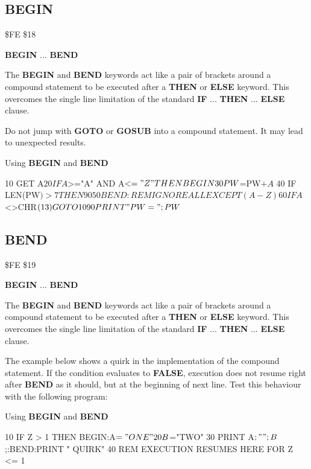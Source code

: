 
\newpage
\subsection{BEGIN}
\begin{description}[leftmargin=3cm,style=nextline]
\item [Token:] \$FE \$18
\item [Format:] {\bf BEGIN} ... {\bf BEND}
\item [Usage:] The {\bf BEGIN} and {\bf BEND} keywords act like
               a pair of brackets around a compound statement
               to be executed after a {\bf THEN} or {\bf ELSE} keyword.
               This overcomes the single line limitation of the
               standard {\bf IF} ... {\bf THEN} ... {\bf ELSE} clause.
\item [Remarks:] Do not jump with {\bf GOTO} or {\bf GOSUB} into a
                 compound statement. It may lead to unexpected
                 results.
\item [Example:] Using {\bf BEGIN} and {\bf BEND}
\begin{screenoutput}
10 GET A$
20 IF A$>="A" AND A$<="Z" THEN BEGIN
30 PW$=PW$+A$
40 IF LEN(PW$)>7 THEN 90
50 BEND :REM IGNORE ALL EXCEPT (A-Z)
60 IF A$<>CHR$(13) GOTO 10
90 PRINT "PW=";PW$
\end{screenoutput}
\end{description}


\newpage
\subsection{BEND}
\begin{description}[leftmargin=3cm,style=nextline]
\item [Token:] \$FE \$19
\item [Format:] {\bf BEGIN} ... {\bf BEND}
\item [Usage:] The {\bf BEGIN} and {\bf BEND} keywords act like
               a pair of brackets around a compound statement
               to be executed after a {\bf THEN} or {\bf ELSE} keyword.
               This overcomes the single line limitation of the
               standard {\bf IF} ... {\bf THEN} ... {\bf ELSE} clause.
\item [Remarks:] The example below shows a quirk in the implementation
                 of the compound statement.
                 If the condition evaluates to {\bf FALSE}, execution
                 does not resume right after {\bf BEND} as it should,
                 but at the beginning of next line.
                 Test this behaviour with the following program:
\item [Example:] Using {\bf BEGIN} and {\bf BEND}
\begin{screenoutput}
10 IF Z > 1 THEN BEGIN:A$="ONE"
20 B$="TWO"
30 PRINT A$;" ";B$;:BEND:PRINT " QUIRK"
40 REM EXECUTION RESUMES HERE FOR Z <= 1
\end{screenoutput}
\end{description}

